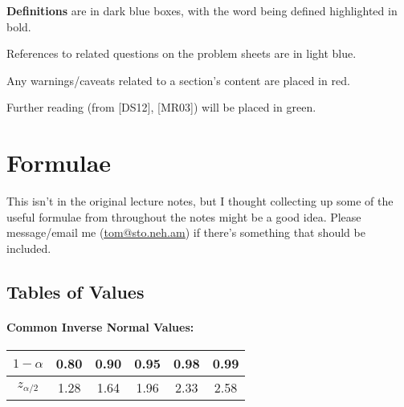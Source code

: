 \documentclass[a4paper]{article}
\begin{document}
        \begin{definition}[Introduction]
            \textbf{Definitions} are in dark blue boxes, with the word being
            defined highlighted in bold.
        \end{definition}

        \begin{relq}
            References to related questions on the problem sheets are in light
            blue.
        \end{relq}

        \begin{warn}
            Any warnings/caveats related to a section's content are placed in
            red.
        \end{warn}

        \begin{fread}
            Further reading (from [DS12], [MR03]) will be placed in green.
        \end{fread}

    \newpage
    \section*{Formulae}
        This isn't in the original lecture notes, but I thought collecting up
        some of the useful formulae from throughout the notes might be a good
        idea. Please message/email me (\href{mailto:tom@sto.neh.am}
        {\underline{tom@sto.neh.am}}) if there's something that should be
        included.

        \subsection*{Tables of Values}
            \paragraph{Common Inverse Normal Values:}
                \begin{center}
                    \begin{tabular}{c | c c c c c}
                        $1 - \alpha$ & 0.80 & 0.90 & 0.95 & 0.98 & 0.99 \\
                        \hline
                        $z_{\alpha/2}$ & 1.28 & 1.64 & 1.96 & 2.33 & 2.58
                    \end{tabular}
                \end{center}
\end{document}
